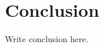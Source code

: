 \documentclass[a4paper,11pt,oneside,openany,fleqn]{jsbook}
\begin{document}
    \chapter{Conclusion}
    Write conclusion here.
\end{document}
